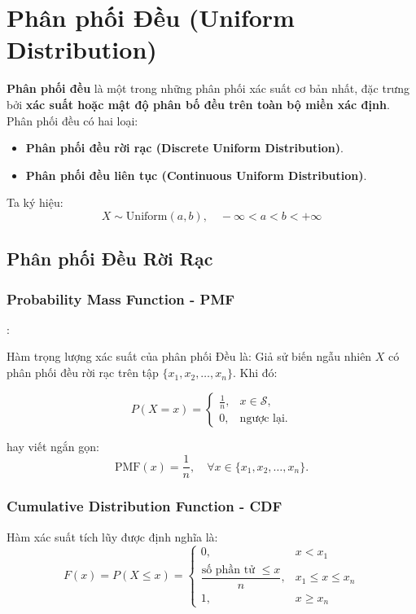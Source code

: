 \documentclass[a4paper,12pt]{article}
\begin{document}
\section{Phân phối Đều (Uniform Distribution)}

\textbf{Phân phối đều} là một trong những phân phối xác suất cơ bản nhất, đặc trưng bởi \textbf{xác suất hoặc mật độ phân bố đều trên toàn bộ miền xác định}.  
Phân phối đều có hai loại:
\begin{itemize}
    \item \textbf{Phân phối đều rời rạc (Discrete Uniform Distribution)}.
    \item \textbf{Phân phối đều liên tục (Continuous Uniform Distribution)}.
\end{itemize}

Ta ký hiệu:
\[
X \sim \mathrm{Uniform}(a, b), \quad -\infty < a < b < +\infty
\]

\subsection{Phân phối Đều Rời Rạc}

\subsubsection{Probability Mass Function - PMF}:

Hàm trọng lượng xác suất của phân phối Đều là:
Giả sử biến ngẫu nhiên \( X \) có phân phối đều rời rạc trên tập \( \{x_1, x_2, \ldots, x_n\} \). Khi đó:

\[
P(X = x) =
\begin{cases}
\displaystyle \frac{1}{n}, & x \in \mathcal{S}, \\[1em]
0, & \text{ngược lại}.
\end{cases}
\]

hay viết ngắn gọn:
\[
\mathrm{PMF}(x) = \frac{1}{n}, \quad \forall x \in \{x_1, x_2, \ldots, x_n\}.
\]

\subsubsection{Cumulative Distribution Function - CDF}

Hàm xác suất tích lũy được định nghĩa là:
\[
F(x) = P(X \le x) =
\begin{cases}
0, & x < x_1 \\[0.5em]
\dfrac{\text{số phần tử } \le x}{n}, & x_1 \le x \le x_n \\[0.8em]
1, & x \ge x_n
\end{cases}
\]
  
\end{document}
